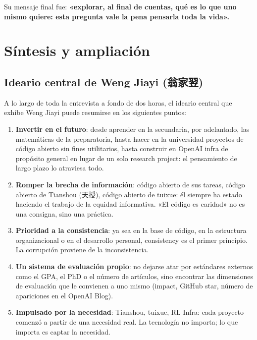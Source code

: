 \documentclass[a4paper]{article}
\begin{document}
Su mensaje final fue: \textbf{«explorar, al final de cuentas, qué es lo que uno mismo quiere: esta pregunta vale la pena pensarla toda la vida».}

\section{Síntesis y ampliación}

\subsection{Ideario central de Weng Jiayi (翁家翌)}

A lo largo de toda la entrevista a fondo de dos horas, el ideario central que exhibe Weng Jiayi puede resumirse en los siguientes puntos:

\begin{enumerate}
    \item \textbf{Invertir en el futuro}: desde aprender en la secundaria, por adelantado, las matemáticas de la preparatoria, hasta hacer en la universidad proyectos de código abierto sin fines utilitarios, hasta construir en OpenAI infra de propósito general en lugar de un solo research project: el pensamiento de largo plazo lo atraviesa todo.

    \item \textbf{Romper la brecha de información}: código abierto de sus tareas, código abierto de Tianshou (天授), código abierto de tuixue: él siempre ha estado haciendo el trabajo de la equidad informativa. «El código es caridad» no es una consigna, sino una práctica.

    \item \textbf{Prioridad a la consistencia}: ya sea en la base de código, en la estructura organizacional o en el desarrollo personal, consistency es el primer principio. La corrupción proviene de la inconsistencia.

    \item \textbf{Un sistema de evaluación propio}: no dejarse atar por estándares externos como el GPA, el PhD o el número de artículos, sino encontrar las dimensiones de evaluación que le convienen a uno mismo (impact, GitHub star, número de apariciones en el OpenAI Blog).

    \item \textbf{Impulsado por la necesidad}: Tianshou, tuixue, RL Infra: cada proyecto comenzó a partir de una necesidad real. La tecnología no importa; lo que importa es captar la necesidad.
\end{enumerate}
\end{document}
